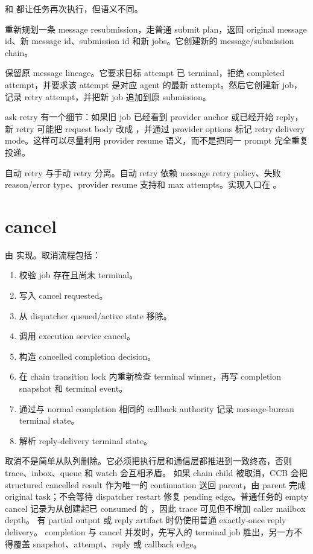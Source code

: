  和  都让任务再次执行，但语义不同。

 重新规划一条 message resubmission，走普通 submit plan，返回 original message id、新 message id、submission id 和新 jobs。它创建新的 message/submission chain。

 保留原 message lineage。它要求目标 attempt 已 terminal，拒绝 completed attempt，并要求该 attempt 是对应 agent 的最新 attempt。然后它创建新 job，记录 retry attempt，并把新 job 追加到原 submission。

ask retry 有一个细节：如果旧 job 已经看到 provider anchor 或已经开始 reply，新 retry 可能把 request body 改成 ，并通过 provider options 标记 retry delivery mode。这样可以尽量利用 provider resume 语义，而不是把同一 prompt 完全重复投递。

自动 retry 与手动 retry 分离。自动 retry 依赖 message retry policy、失败 reason/error type、provider resume 支持和 max attempts。实现入口在 。

\section{cancel}

 由  实现。取消流程包括：

\begin{enumerate}
  \item 校验 job 存在且尚未 terminal。
  \item 写入 cancel requested。
  \item 从 dispatcher queued/active state 移除。
  \item 调用 execution service cancel。
  \item 构造 cancelled completion decision。
  \item 在 chain transition lock 内重新检查 terminal winner，再写 completion
        snapshot 和 terminal event。
  \item 通过与 normal completion 相同的 callback authority 记录
        message-bureau terminal state。
  \item 解析 reply-delivery terminal state。
\end{enumerate}

取消不是简单从队列删除。它必须把执行层和通信层都推进到一致终态，否则 trace、inbox、queue 和 watch 会互相矛盾。
如果 chain child 被取消，CCB 会把 structured cancelled result 作为唯一的
continuation 送回 parent，由 parent 完成 original task；不会等待 dispatcher
restart 修复 pending edge。普通任务的 empty cancel 记录为从创建起已 consumed
的 ，因此 trace 可见但不增加 caller mailbox depth。
有 partial output 或 reply artifact 时仍使用普通 exactly-once reply delivery。
completion 与 cancel 并发时，先写入的 terminal job 胜出，另一方不得覆盖
snapshot、attempt、reply 或 callback edge。

